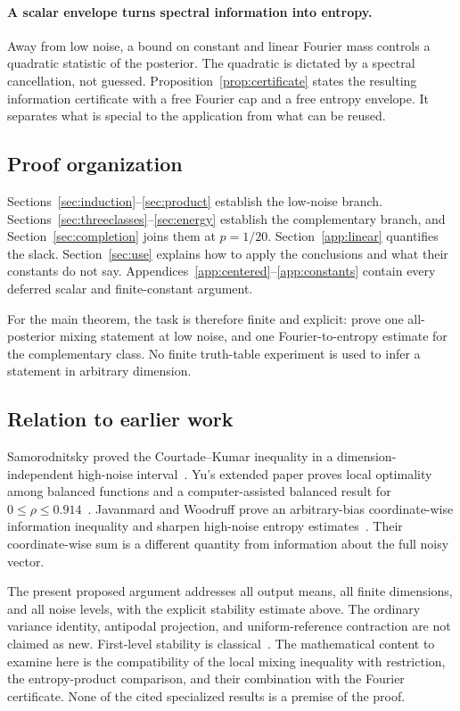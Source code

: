 \paragraph{A scalar envelope turns spectral information into entropy.}
Away from low noise, a bound on constant and linear Fourier mass controls a quadratic statistic of the posterior. The quadratic is dictated by a spectral cancellation, not guessed. Proposition~\ref{prop:certificate} states the resulting information certificate with a free Fourier cap and a free entropy envelope. It separates what is special to the application from what can be reused.

\subsection{Proof organization}
Sections~\ref{sec:induction}--\ref{sec:product} establish the low-noise branch. Sections~\ref{sec:threeclasses}--\ref{sec:energy} establish the complementary branch, and Section~\ref{sec:completion} joins them at $p=1/20$. Section~\ref{app:linear} quantifies the slack. Section~\ref{sec:use} explains how to apply the conclusions and what their constants do not say. Appendices~\ref{app:centered}--\ref{app:constants} contain every deferred scalar and finite-constant argument.

For the main theorem, the task is therefore finite and explicit: prove one all-posterior mixing statement at low noise, and one Fourier-to-entropy estimate for the complementary class. No finite truth-table experiment is used to infer a statement in arbitrary dimension.

\subsection{Relation to earlier work}
Samorodnitsky proved the Courtade--Kumar inequality in a dimension-independent high-noise interval~\cite{Sam}. Yu's extended paper proves local optimality among balanced functions and a computer-assisted balanced result for $0\le\rho\le0.914$~\cite{YuLocal}. Javanmard and Woodruff prove an arbitrary-bias coordinate-wise information inequality and sharpen high-noise entropy estimates~\cite{JW}. Their coordinate-wise sum is a different quantity from information about the full noisy vector.

The present proposed argument addresses all output means, all finite dimensions, and all noise levels, with the explicit stability estimate above. The ordinary variance identity, antipodal projection, and uniform-reference contraction are not claimed as new. First-level stability is classical~\cite{FKN}. The mathematical content to examine here is the compatibility of the local mixing inequality with restriction, the entropy-product comparison, and their combination with the Fourier certificate. None of the cited specialized results is a premise of the proof.

